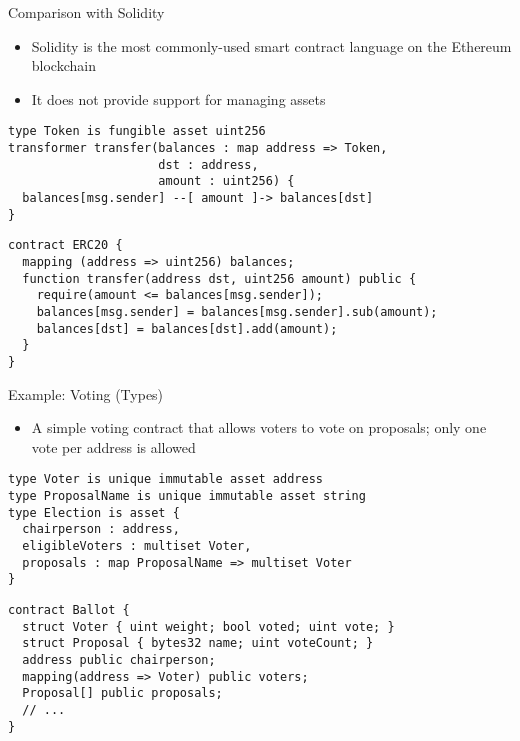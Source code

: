 \documentclass[leqno,presentation,usenames,dvipsnames]{beamer}
\begin{document}
\begin{frame}[fragile]{Comparison with Solidity}
    \begin{itemize}
        \item Solidity is the most commonly-used smart contract language on the Ethereum blockchain
        \item It does not provide support for managing assets
    \end{itemize}

\begin{lstlisting}[language=flow, xleftmargin=-0.5em, basicstyle=\footnotesize\ttfamily]
type Token is fungible asset uint256
transformer transfer(balances : map address => Token,
                     dst : address,
                     amount : uint256) {
  balances[msg.sender] --[ amount ]-> balances[dst]
}
\end{lstlisting}
\begin{lstlisting}[language=Solidity, xleftmargin=-0.5em, basicstyle=\scriptsize\ttfamily]
contract ERC20 {
  mapping (address => uint256) balances;
  function transfer(address dst, uint256 amount) public {
    require(amount <= balances[msg.sender]);
    balances[msg.sender] = balances[msg.sender].sub(amount);
    balances[dst] = balances[dst].add(amount);
  }
}
\end{lstlisting}
\end{frame}

\begin{frame}[fragile]{Example: Voting (Types)}
    \begin{itemize}
        \item A simple voting contract that allows voters to vote on proposals; only one vote per address is allowed
    \end{itemize}
\begin{lstlisting}[language=flow, xleftmargin=-0.2em, basicstyle=\scriptsize\ttfamily]
type Voter is unique immutable asset address
type ProposalName is unique immutable asset string
type Election is asset {
  chairperson : address,
  eligibleVoters : multiset Voter,
  proposals : map ProposalName => multiset Voter
}
\end{lstlisting}
\begin{lstlisting}[language=Solidity, xleftmargin=-0.2em, basicstyle=\scriptsize\ttfamily]
contract Ballot {
  struct Voter { uint weight; bool voted; uint vote; }
  struct Proposal { bytes32 name; uint voteCount; }
  address public chairperson;
  mapping(address => Voter) public voters;
  Proposal[] public proposals;
  // ...
}
\end{lstlisting}
\end{frame}
\end{document}
